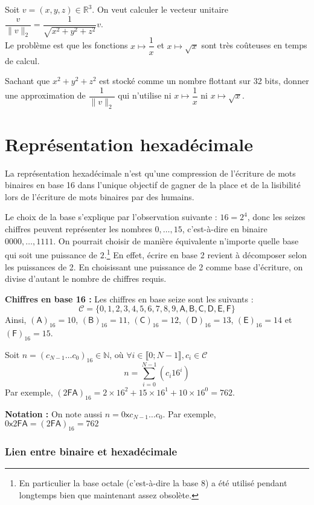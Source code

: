 \documentclass[../../main.tex]{subfiles}
\begin{document}
Soit $v = (x, y, z)\in\mathbb{R}^3$. On veut calculer le vecteur unitaire $\dfrac{v}{\lVert v\rVert_2} = \dfrac{1}{\sqrt{x^2 + y^2 + z^2}}v$. \\
Le problème est que les fonctions $x\mapsto\dfrac{1}{x}$ et $x\mapsto\sqrt{x}$ sont très coûteuses en temps de calcul.

Sachant que $x^2 + y^2 + z^2$ est stocké comme un nombre flottant sur 32 bits, donner une approximation de $\dfrac{1}{\lVert v\rVert_2}$ qui n'utilise ni $x\mapsto\dfrac{1}{x}$ ni $x\mapsto\sqrt{x}$.
\section{Représentation hexadécimale} \label{sec:repr_sentation_hexad_cimale}
La représentation hexadécimale n'est qu'une compression de l'écriture de mots binaires en base 16 dans l'unique objectif de gagner de la place et de la lisibilité lors de l'écriture de mots binaires par des humains.

Le choix de la base s'explique par l'observation suivante : $16 = 2^{4}$, donc les seizes chiffres peuvent représenter les nombres $0, \dots, 15$, c'est-à-dire en binaire $0000, \dots, 1111$. On pourrait choisir de manière équivalente n'importe quelle base qui soit une puissance de $2$.\footnote{En particulier la base octale (c'est-à-dire la base 8) a été utilisé pendant longtemps bien que maintenant assez obsolète.} En effet, écrire en base 2 revient à décomposer selon les puissances de 2. En choisissant une puissance de 2 comme base d'écriture, on divise d'autant le nombre de chiffres requis.

\textbf{Chiffres en base 16 :} Les chiffres en base seize sont les suivants :
$$\mathcal{C} = \{0, 1, 2, 3, 4, 5, 6, 7, 8, 9, \textsf{A}, \textsf{B}, \textsf{C}, \textsf{D}, \textsf{E}, \textsf{F}\}$$
Ainsi, $(\textsf{A})_{16} = 10$, $(\textsf{B})_{16} = 11$, $(\textsf{C})_{16} = 12$, $(\textsf{D})_{16} = 13$, $(\textsf{E})_{16} = 14$ et $(\textsf{F})_{16} = 15$.

Soit $n = (c_{N-1}\dots c_{0})_{16}\in{\mathbb{N}}$, où $\forall{i\in{\llbracket0; N-1\rrbracket}}, c_{i}\in{\mathcal{C}}$
$$n = \displaystyle\sum_{i = 0}^{N-1}\left(c_{i}16^{i}\right)$$ 
Par exemple, $(2\textsf{FA})_{16} = 2\times{16^{2}} + 15\times{16^{1}} + 10\times{16^{0}} = 762$.

\textbf{Notation :} On note aussi $n = 0\textsf{x}c_{N-1}\dots c_{0}$. Par exemple, $0\textsf{x}2\textsf{FA} = (2\textsf{FA})_{16} = 762$

\subsubsection{Lien entre binaire et hexadécimale} \label{ssub:lien_entre_binaire_et_hexad_cimale}
\end{document}
